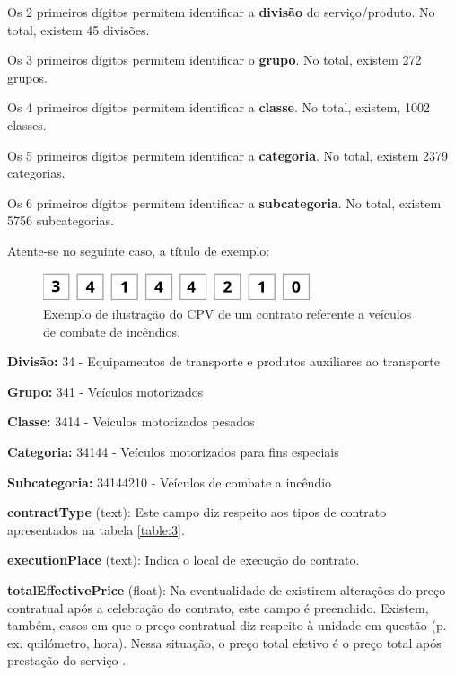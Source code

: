 \begin{my_itemize}
\begin{my_itemize}
	\item[$\circ$]  Os 2 primeiros dígitos permitem identificar a \textbf{divisão} do serviço/produto. No total, existem 45 divisões.
	\item[$\circ$]  Os 3 primeiros dígitos permitem identificar o \textbf{grupo}. No total, existem 272 grupos.
	\item[$\circ$]  Os 4 primeiros dígitos permitem identificar a \textbf{classe}. No total, existem, 1002 classes.
	\item[$\circ$]  Os 5 primeiros dígitos permitem identificar a \textbf{categoria}. No total, existem 2379 categorias.
	\item[$\circ$]  Os 6 primeiros dígitos permitem identificar a \textbf{subcategoria}. No total, existem 5756 subcategorias.
\end{my_itemize}

Atente-se no seguinte caso, a título de exemplo:

\begin{figure}[H]
	\centering
	\includegraphics[width=0.7\textwidth]{imagens/cpv.png}
	\caption{Exemplo de ilustração do CPV de um contrato referente a veículos de combate de incêndios.}
	\label{fig:cpv}
\end{figure}


\begin{my_itemize}
	\item[$\circ$]  \textbf{Divisão:} 34 - Equipamentos de transporte e produtos auxiliares ao transporte
	\item[$\circ$]  \textbf{Grupo:} 341 - Veículos motorizados
	\item[$\circ$]  \textbf{Classe:} 3414 - Veículos motorizados pesados
	\item[$\circ$]  \textbf{Categoria:} 34144 - Veículos motorizados para fins especiais
	\item[$\circ$]  \textbf{Subcategoria:} 34144210 - Veículos de combate a incêndio
\end{my_itemize}



\item \textbf{contractType} (text): Este campo diz respeito aos tipos de contrato apresentados na tabela \ref{table:3}. 

\item \textbf{executionPlace} (text): Indica o local de execução do contrato. 

\item \textbf{totalEffectivePrice} (float): Na eventualidade de existirem alterações do preço contratual após a celebração do contrato, este campo é preenchido. Existem, também, casos em que o preço contratual diz respeito à unidade em questão (p. ex. quilómetro, hora). Nessa situação, o preço total efetivo é o preço total após prestação do serviço \cite{jardinagem}.  

\end{my_itemize}

